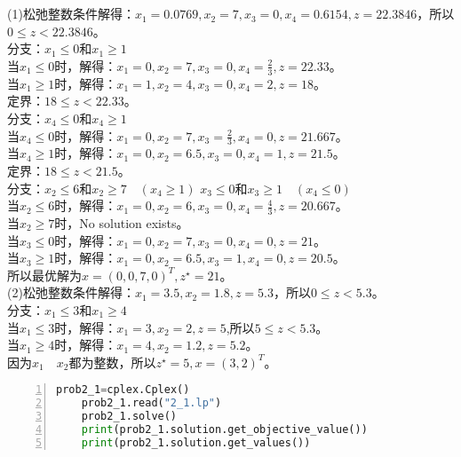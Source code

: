 \documentclass{article}
\begin{document}
\section{}
\noindent
(1)松弛整数条件解得：$x_1=0.0769,x_2=7,x_3=0,x_4=0.6154,z=22.3846$，所以$0 \leq z <22.3846$。\\
分支：$x_1\leq 0$和$x_1 \geq 1$ \\
当$x_1\leq 0$时，解得：$x_1=0,x_2=7,x_3=0,x_4=\frac{2}{3},z=22.33$。\\
当$x_1\geq 1$时，解得：$x_1=1,x_2=4,x_3=0,x_4=2,z=18$。\\
定界：$18\leq z<22.33$。\\
分支：$x_4\leq 0$和$x_4\geq 1$\\
当$x_4\leq 0$时，解得：$x_1=0,x_2=7,x_3=\frac{2}{3},x_4=0,z=21.667$。\\
当$x_4\geq 1$时，解得：$x_1=0,x_2=6.5,x_3=0,x_4=1,z=21.5$。\\
定界：$18\leq z<21.5$。\\
分支：$x_2\leq 6$和$x_2\geq 7\quad(x_4\geq 1)$ \quad \quad $x_3\leq 0$和$x_3\geq 1\quad (x_4\leq 0)$\\
当$x_2\leq 6$时，解得：$x_1=0,x_2=6,x_3=0,x_4=\frac{4}{3},z=20.667$。\\
当$x_2\geq 7$时，No solution exists。\\
当$x_3\leq 0$时，解得：$x_1=0,x_2=7,x_3=0,x_4=0,z=21$。\\
当$x_3\geq 1$时，解得：$x_1=0,x_2=6.5,x_3=1,x_4=0,z=20.5$。\\
所以最优解为$x=(0,0,7,0)^{T},z^{\star}=21$。\\
(2)松弛整数条件解得：$x_1=3.5,x_2=1.8,z=5.3$，所以$0 \leq z <5.3$。\\
分支：$x_1 \leq 3$和$x_1 \geq 4$\\
当$x_1 \leq 3$时，解得：$x_1=3,x_2=2,z=5$,所以$5 \leq z <5.3$。\\
当$x_1 \geq 4$时，解得：$x_1=4,x_2=1.2,z=5.2$。\\
因为$x_1 \quad x_2$都为整数，所以$z^{\star}=5,x=(3,2)^{T}$。
\begin{lstlisting}[language = python, numbers=left, 
    numberstyle=\tiny,keywordstyle=\color{blue!70},
    commentstyle=\color{red!50!green!50!blue!50},frame=shadowbox,
    rulesepcolor=\color{red!20!green!20!blue!20},basicstyle=\ttfamily]
    prob2_1=cplex.Cplex()
    prob2_1.read("2_1.lp")
    prob2_1.solve()
    print(prob2_1.solution.get_objective_value())
    print(prob2_1.solution.get_values())
\end{lstlisting}
\end{document}
